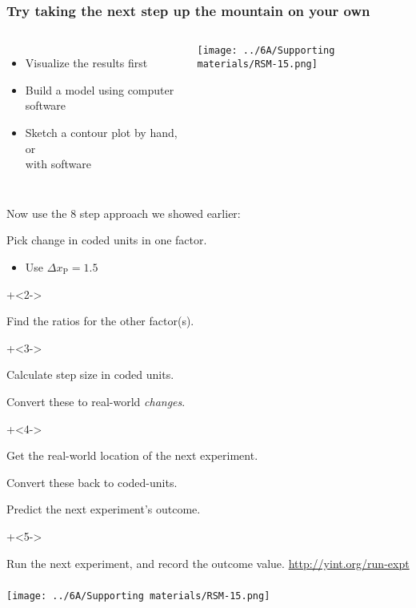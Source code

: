 \begin{frame}\frametitle{Try taking the next step up the mountain on your own}
	
	\begin{columns}[T]
		
			\begin{itemize}
				\item	Visualize the results first
				\item	Build a model using computer software
				\item	Sketch a contour plot by hand, or \\with software
			\end{itemize}
			\centerline{\texttt{[image: ../6A/Supporting materials/RSM-15.png]}}
	\end{columns}
	
	\pause
	\vspace{-2.5cm}
	{\color{myOrange}Now use the 8 step approach we showed earlier:}
	\vspace{0.2cm}
	\begin{enumerate}

			\item	Pick change in coded units in one factor. 
				\begin{itemize}
					\item	Use $\Delta x_\text{P}= 1.5$
				\end{itemize}
			\onslide+<2->{
				\item	Find the ratios for the other factor(s).
			}
			\onslide+<3->{
				\item	Calculate step size in coded units.
				\item	Convert these to real-world \emph{changes}.
			}
			\onslide+<4->{
				\item	Get the real-world location	of the next experiment.
				\item	Convert these back to coded-units.
				\item	Predict the next experiment's outcome.
			}
			\onslide+<5->{
				\item	Run the next experiment, and record the outcome value.  \href{http://yint.org/run-expt}{http://yint.org/run-expt}
			}
	\end{enumerate}
	
\end{frame}

\begin{frame}\frametitle{}
	\centerline{\texttt{[image: ../6A/Supporting materials/RSM-15.png]}}
\end{frame}


